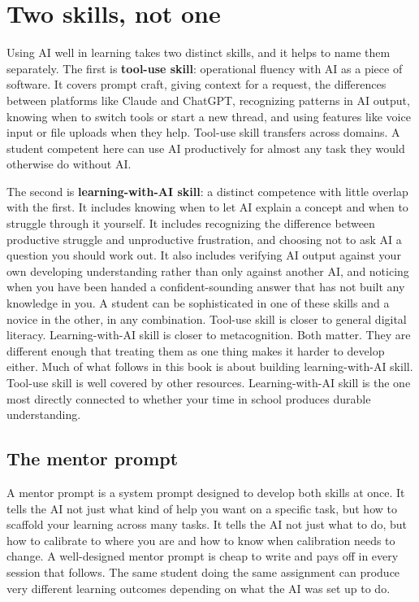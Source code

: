 \documentclass{SIAMbook2023}
\begin{document}
\section{Two skills, not one}
\label{sec:two-skills}%
%

Using AI well in learning takes two distinct skills, and it helps to name them separately. The first is \textbf{tool-use skill}: operational fluency with AI as a piece of software. It covers prompt craft, giving context for a request, the differences between platforms like Claude and ChatGPT, recognizing patterns in AI output, knowing when to switch tools or start a new thread, and using features like voice input or file uploads when they help. Tool-use skill transfers across domains. A student competent here can use AI productively for almost any task they would otherwise do without AI.

The second is \textbf{learning-with-AI skill}: a distinct competence with little overlap with the first. It includes knowing when to let AI explain a concept and when to struggle through it yourself. It includes recognizing the difference between productive struggle and unproductive frustration, and choosing not to ask AI a question you should work out. It also includes verifying AI output against your own developing understanding rather than only against another AI, and noticing when you have been handed a confident-sounding answer that has not built any knowledge in you. A student can be sophisticated in one of these skills and a novice in the other, in any combination. Tool-use skill is closer to general digital literacy. Learning-with-AI skill is closer to metacognition. Both matter. They are different enough that treating them as one thing makes it harder to develop either. Much of what follows in this book is about building learning-with-AI skill. Tool-use skill is well covered by other resources. Learning-with-AI skill is the one most directly connected to whether your time in school produces durable understanding.

\subsection{The mentor prompt}
\label{subsec:mentor-prompt}%

A mentor prompt is a system prompt designed to develop both skills at once. It tells the AI not just what kind of help you want on a specific task, but how to scaffold your learning across many tasks. It tells the AI not just what to do, but how to calibrate to where you are and how to know when calibration needs to change. A well-designed mentor prompt is cheap to write and pays off in every session that follows. The same student doing the same assignment can produce very different learning outcomes depending on what the AI was set up to do.
\end{document}

